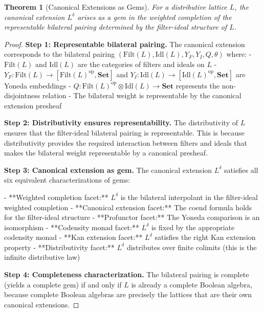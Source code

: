 \documentclass[11pt]{article}
\theoremstyle{plain}
\newtheorem{theorem}{Theorem}[section]
\theoremstyle{definition}
\theoremstyle{remark}
\newcommand{\op}{\mathrm{op}}
\begin{document}
\begin{theorem}[Canonical Extensions as Gems]\label{thm:canonical-extensions-gems}
For a distributive lattice $L$, the canonical extension $L^{\delta}$ arises as a gem in the weighted completion of the representable bilateral pairing determined by the filter-ideal structure of $L$.
\end{theorem}

\begin{proof}
\textbf{Step 1: Representable bilateral pairing.}
The canonical extension corresponds to the bilateral pairing $(\mathrm{Filt}(L), \mathrm{Idl}(L), Y_F, Y_I, Q, \theta)$ where:
- $\mathrm{Filt}(L)$ and $\mathrm{Idl}(L)$ are the categories of filters and ideals on $L$
- $Y_F : \mathrm{Filt}(L) \to [\mathrm{Filt}(L)^{\op}, \mathbf{Set}]$ and $Y_I : \mathrm{Idl}(L) \to [\mathrm{Idl}(L)^{\op}, \mathbf{Set}]$ are Yoneda embeddings
- $Q : \mathrm{Filt}(L)^{\op} \otimes \mathrm{Idl}(L) \to \mathbf{Set}$ represents the non-disjointness relation
- The bilateral weight is representable by the canonical extension presheaf

\textbf{Step 2: Distributivity ensures representability.}
The distributivity of $L$ ensures that the filter-ideal bilateral pairing is representable. This is because distributivity provides the required interaction between filters and ideals that makes the bilateral weight representable by a canonical presheaf.

\textbf{Step 3: Canonical extension as gem.}
The canonical extension $L^{\delta}$ satisfies all six equivalent characterizations of gems:

- **Weighted completion facet:** $L^{\delta}$ is the bilateral interpolant in the filter-ideal weighted completion
- **Canonical extension facet:** The coend formula holds for the filter-ideal structure
- **Profunctor facet:** The Yoneda comparison is an isomorphism
- **Codensity monad facet:** $L^{\delta}$ is fixed by the appropriate codensity monad
- **Kan extension facet:** $L^{\delta}$ satisfies the right Kan extension property
- **Distributivity facet:** $L^{\delta}$ distributes over finite colimits (this is the infinite distributive law)

\textbf{Step 4: Completeness characterization.}
The bilateral pairing is complete (yields a complete gem) if and only if $L$ is already a complete Boolean algebra, because complete Boolean algebras are precisely the lattices that are their own canonical extensions.
\end{proof}
\end{document}
